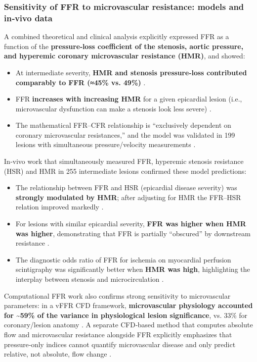 \subsubsection*{Sensitivity of FFR to microvascular resistance: models and in‑vivo data}


A combined theoretical and clinical analysis explicitly expressed FFR as a function of the \textbf{pressure‑loss coefficient of the stenosis, aortic pressure, and hyperemic coronary microvascular resistance (HMR)}, and showed:


\begin{itemize}
\item At intermediate severity, \textbf{HMR and stenosis pressure‑loss contributed comparably to FFR (≈45\% vs. 49\%)}  \cite{Garcia2019Relationship}.
\item FFR \textbf{increases with increasing HMR} for a given epicardial lesion (i.e., microvascular dysfunction can make a stenosis look less severe)  \cite{Garcia2019Relationship} \cite{Van De Hoef2014Impact}.
\item The mathematical FFR–CFR relationship is “exclusively dependent on coronary microvascular resistances,” and the model was validated in 199 lesions with simultaneous pressure/velocity measurements  \cite{Garcia2019Relationship}.
\end{itemize}


In‑vivo work that simultaneously measured FFR, hyperemic stenosis resistance (HSR) and HMR in 255 intermediate lesions confirmed these model predictions:


\begin{itemize}
\item The relationship between FFR and HSR (epicardial disease severity) was \textbf{strongly modulated by HMR}; after adjusting for HMR the FFR–HSR relation improved markedly  \cite{Van De Hoef2014Impact}.
\item For lesions with similar epicardial severity, \textbf{FFR was higher when HMR was higher}, demonstrating that FFR is partially “obscured” by downstream resistance  \cite{Van De Hoef2014Impact}.
\item The diagnostic odds ratio of FFR for ischemia on myocardial perfusion scintigraphy was significantly better when \textbf{HMR was high}, highlighting the interplay between stenosis and microcirculation  \cite{Van De Hoef2014Impact}.
\end{itemize}


Computational FFR work also confirms strong sensitivity to microvascular parameters: in a vFFR CFD framework, \textbf{microvascular physiology accounted for \textasciitilde{}59\% of the variance in physiological lesion significance}, vs. 33\% for coronary/lesion anatomy  \cite{Soto2017Fast}. A separate CFD‑based method that computes absolute flow and microvascular resistance alongside FFR explicitly emphasizes that pressure‑only indices cannot quantify microvascular disease and only predict relative, not absolute, flow change  \cite{Morris2020A}.


